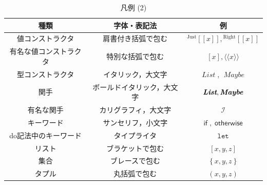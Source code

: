 \documentclass[a5paper,twoside,fleqn]{jsbook}
\def\[{\left[\!\left[}
\def\]{\right]\!\right]}
\newcommand{\Langle}{\langle\!\langle}
\newcommand{\Rangle}{\rangle\!\rangle}
\newcommand{\mKeyword}[1]{\mathsf{#1}} %
\newcommand{\mVarKeyword}[1]{\texttt{#1}} %
\newcommand{\mDoLetKeyword}{\mVarKeyword{let}}
\newcommand{\mIfKeyword}{\mKeyword{if}}
\newcommand{\mOtherwiseKeyword}{\mKeyword{otherwise}}
\DeclareMathOperator{\mIf}{\mIfKeyword}
\DeclareMathOperator{\mOtherwise}{\mOtherwiseKeyword}
\newcommand{\mSpecialSub}[1]{\text{#1}}
\newcommand{\mRight}{\mSpecialSub{Right}}
\newcommand{\mTypeConstructor}[1]{\textit{#1}}
\DeclareMathOperator{\mListTypeConstructor}{\mTypeConstructor{List}}
\DeclareMathOperator{\mMaybeTypeConstructor}{\mTypeConstructor{Maybe}}
\newcommand{\mGenericValueConstructor}[1]{\mathrm{#1}}
\newcommand{\mGenericWith}[2]{{}^\mGenericValueConstructor{#1}\[#2\]}
\newcommand{\mRightWith}[1]{\mGenericWith{\mRight}{#1}}
\newcommand{\mJustWith}[1]{\mGenericWith{Just}{#1}}
\newcommand{\mFuncWith}[1]{\Langle#1\Rangle}
\newcommand{\mListWith}[1]{\left[#1\right]}
\newcommand{\mSetWith}[1]{\left\{#1\right\}}
\newcommand{\mTupleWith}[1]{\left(#1\right)}
\newcommand{\mTupleUnboxedWith}[1]{\texttt{(\#}#1\texttt{\#)}}
\newcommand{\mFunctor}[1]{\textit{\textbf{#1}}}
\newcommand{\mSpecialFunctor}[1]{\mathcal{#1}} %
\DeclareMathOperator{\mIFunctor}{\mSpecialFunctor{I}}
\begin{document}
\begin{table}[p]
\caption{凡例 (2)}
\begin{center}
\begin{tabular}{||c|c|c||}
\hline
種類&字体・表記法&例\\
\hline\hline
値コンストラクタ&肩書付き括弧で包む&$\mJustWith{x},\mRightWith{x}$\\
有名な値コンストラクタ&特別な括弧で包む&$\mListWith{x},\mFuncWith{x}$\\
\hline
型コンストラクタ&イタリック，大文字&$\mListTypeConstructor$, $\mMaybeTypeConstructor$\\
関手&ボールドイタリック，大文字&$\mFunctor{List},\mFunctor{Maybe}$\\
有名な関手&カリグラフィ，大文字&$\mIFunctor$\\
キーワード&サンセリフ，小文字&$\mIf,\mOtherwise$\\
do記法中のキーワード&タイプライタ&$\mDoLetKeyword$\\
\hline
リスト&ブラケットで包む&$\mListWith{x,y,z}$\\
集合&ブレースで包む&$\mSetWith{x,y,z}$\\
タプル&丸括弧で包む&$\mTupleWith{x,y,z}$\\
\hline
\end{tabular}
\end{center}
\end{table}
\end{document}
